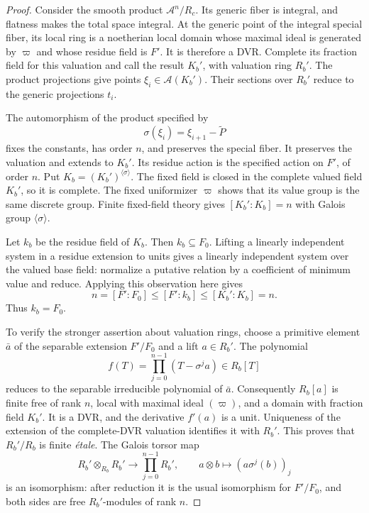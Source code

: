 \begin{proof}
Consider the smooth product $\mathcal A^n/R_c$.  Its generic fiber is
integral, and flatness makes the total space integral.  At the generic
point of the integral special fiber, its local ring is a noetherian local
domain whose maximal ideal is generated by $\varpi$ and whose residue
field is $F'$.  It is therefore a DVR.  Complete its fraction field for
this valuation and call the result $K_b'$, with valuation ring $R_b'$.
The product projections give points $\xi_i\in\mathcal A(K_b')$.
Their sections over $R_b'$ reduce to the generic projections $t_i$.

The automorphism of the product specified by
\[
             \sigma(\xi_i)=\xi_{i+1}-\widetilde P
\]
fixes the constants, has order $n$, and preserves the special fiber.
It preserves the valuation and extends to $K_b'$.  Its residue action
is the specified action on $F'$, of order $n$.  Put
$K_b=(K_b')^{\langle\sigma\rangle}$.  The fixed field is closed in the
complete valued field $K_b'$, so it is complete.  The fixed uniformizer
$\varpi$ shows that its value group is the same discrete group.
Finite fixed-field theory gives
$[K_b':K_b]=n$ with Galois group $\langle\sigma\rangle$.

Let $k_b$ be the residue field of $K_b$.  Then $k_b\subseteq F_0$.
Lifting a linearly independent system in a residue extension to units
gives a linearly independent system over the valued base field:
normalize a putative relation by a coefficient of minimum value and
reduce.  Applying this observation here gives
\[
 n=[F':F_0]\leq [F':k_b]\leq[K_b':K_b]=n.
\]
Thus $k_b=F_0$.

To verify the stronger assertion about valuation rings, choose a
primitive element $\bar a$ of the separable extension $F'/F_0$ and a lift
$a\in R_b'$.  The polynomial
\[
              f(T)=\prod_{j=0}^{n-1}(T-\sigma^j a)\in R_b[T]
\]
reduces to the separable irreducible polynomial of $\bar a$.
Consequently $R_b[a]$ is finite free of rank $n$, local with maximal
ideal $(\varpi)$, and a domain with fraction field $K_b'$.
It is a DVR, and the derivative $f'(a)$ is a unit.  Uniqueness of the
extension of the complete-DVR valuation identifies it with $R_b'$.
This proves that $R_b'/R_b$ is finite \emph{\'{e}tale}.
The Galois torsor map
\[
 R_b'\otimes_{R_b}R_b'\longrightarrow\prod_{j=0}^{n-1}R_b',
 \qquad a\otimes b\longmapsto (a\sigma^j(b))_j
\]
is an isomorphism: after reduction it is the usual isomorphism for
$F'/F_0$, and both sides are free $R_b'$-modules of rank $n$.


\end{proof}
